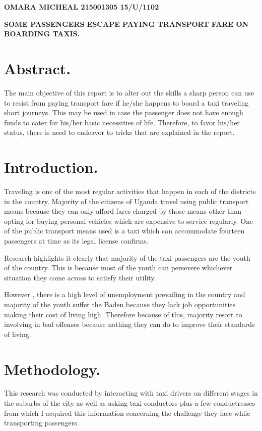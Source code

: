 \documentclass{article}
\begin{document}
\begin {small} \center \textbf{OMARA MICHEAL    215001305     15/U/1102 }\end{small}


\begin{Large}\textbf{SOME PASSENGERS ESCAPE PAYING TRANSPORT FARE ON BOARDING TAXIS.}\end{Large}
\section{Abstract.}
{The main objective of this report is to alter out the skills a sharp person can use to resist from paying transport fare if he/she happens to board a taxi traveling short journeys. This may be used   in case the passenger does not have enough funds to cater for his/her basic necessities of life. Therefore, to favor his/her status, there is need to endeavor to tricks that are explained in the report.}
\section{Introduction.}
Traveling is one of the most regular activities that happen in each of the districts in the country. Majority of the citizens of Uganda travel using public transport means because they can only afford fares charged by those means other than opting for buying personal vehicles which are expensive to service regularly. One of the public transport means used is a taxi which can accommodate fourteen passengers at time as its legal license confirms.

Research highlights it clearly that majority of the taxi passengers are the youth of the country. This is because most of the youth can persevere whichever situation they come across to satisfy their utility.

However , there is a high level of unemployment prevailing in the country and majority of the youth suffer the Baden because they lack job opportunities making their cost of living high. Therefore because of this, majority resort to involving in bad offenses because nothing they can do to improve their standards of living. 


\section{Methodology.}
{This research was conducted by interacting with taxi drivers on different stages in the suburbs of the city as well as asking taxi conductors plus a few conductresses from which I acquired this information concerning the challenge they face while transporting passengers. }
\end{document}
